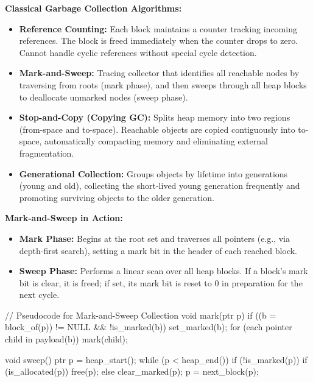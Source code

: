 \begin{definition}
    \textbf{Classical Garbage Collection Algorithms:}
    \begin{itemize}
        \item \textbf{Reference Counting:} Each block maintains a counter tracking incoming references. The block is freed immediately when the counter drops to zero. Cannot handle cyclic references without special cycle detection.
        \item \textbf{Mark-and-Sweep:} Tracing collector that identifies all reachable nodes by traversing from roots (mark phase), and then sweeps through all heap blocks to deallocate unmarked nodes (sweep phase).
        \item \textbf{Stop-and-Copy (Copying GC):} Splits heap memory into two regions (from-space and to-space). Reachable objects are copied contiguously into to-space, automatically compacting memory and eliminating external fragmentation.
        \item \textbf{Generational Collection:} Groups objects by lifetime into generations (young and old), collecting the short-lived young generation frequently and promoting surviving objects to the older generation.
    \end{itemize}
\end{definition}

\begin{example}
    \textbf{Mark-and-Sweep in Action:}
    \begin{itemize}
        \item \textbf{Mark Phase:} Begins at the root set and traverses all pointers (e.g., via depth-first search), setting a mark bit in the header of each reached block.
        \item \textbf{Sweep Phase:} Performs a linear scan over all heap blocks. If a block's mark bit is clear, it is freed; if set, its mark bit is reset to 0 in preparation for the next cycle.
    \end{itemize}
\end{example}

\begin{codeexample}
// Pseudocode for Mark-and-Sweep Collection
void mark(ptr p) {
    if ((b = block_of(p)) != NULL && !is_marked(b)) {
        set_marked(b);
        for (each pointer child in payload(b))
            mark(child);
    }
}

void sweep() {
    ptr p = heap_start();
    while (p < heap_end()) {
        if (!is_marked(p)) {
            if (is_allocated(p))
                free(p);
        } else {
            clear_marked(p);
        }
        p = next_block(p);
    }
}
\end{codeexample}

